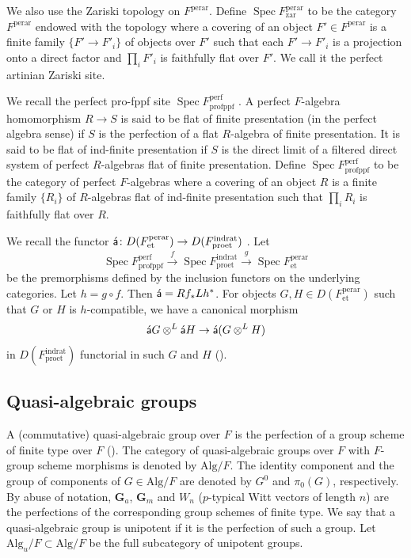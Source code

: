 \documentclass{amsart}
\theoremstyle{remark}
\numberwithin{equation}{subsection}
\newcommand{\compose}{\mathbin{\circ}}
\newcommand{\tensor}{\mathbin{\otimes}}
\newcommand{\et}{\mathrm{et}}
\newcommand{\fppf}{\mathrm{fppf}}
\newcommand{\zar}{\mathrm{zar}}
\newcommand{\Gm}{\mathbf{G}_{m}}
\newcommand{\Ga}{\mathbf{G}_{a}}
\newcommand{\rat}{\mathrm{rat}}
\newcommand{\ind}{\mathrm{ind}}
\newcommand{\pro}{\mathrm{pro}}
\newcommand{\perf}{\mathrm{perf}}
\newcommand{\perar}{\mathrm{perar}}
\newcommand{\Alg}{\mathrm{Alg}}
\newcommand{\algebrize}{\Acute{\mathsf{a}}}
\DeclareMathOperator{\Spec}{Spec}
\begin{document}
We also use the Zariski topology on $F^{\perar}$.
Define $\Spec F^{\perar}_{\zar}$ to be the category $F^{\perar}$
endowed with the topology
where a covering of an object $F' \in F^{\perar}$
is a finite family $\{F' \to F'_{i}\}$ of objects over $F'$
such that each $F' \to F'_{i}$ is a projection onto a direct factor
and $\prod_{i} F'_{i}$ is faithfully flat over $F'$.
We call it the perfect artinian Zariski site.

We recall the perfect pro-fppf site $\Spec F^{\perf}_{\pro\fppf}$ \cite{Suz22Duality}.
A perfect $F$-algebra homomorphism $R \to S$ is said to be
flat of finite presentation (in the perfect algebra sense)
if $S$ is the perfection of a flat $R$-algebra of finite presentation.
It is said to be flat of ind-finite presentation
if $S$ is the direct limit of a filtered direct system of perfect $R$-algebras
flat of finite presentation.
Define $\Spec F^{\perf}_{\pro\fppf}$ to be the category of perfect $F$-algebras
where a covering of an object $R$ is a finite family $\{R_{i}\}$ of $R$-algebras
flat of ind-finite presentation such that $\prod_{i} R_{i}$ is faithfully flat over $R$.

We recall the functor
$\algebrize \colon D(F^{\perar}_{\et}) \to D(F^{\ind\rat}_{\pro\et})$
\cite{Suz21}.
Let
	\begin{equation} \label{0460}
			\Spec F^{\perf}_{\pro\fppf}
		\stackrel{f}{\to}
			\Spec F^{\ind\rat}_{\pro\et}
		\stackrel{g}{\to}
			\Spec F^{\perar}_{\et}
	\end{equation}
be the premorphisms defined by the inclusion functors on the underlying categories.
Let $h = g \compose f$.
Then $\algebrize = R f_{\ast} L h^{\ast}$.
For objects $G, H \in D(F^{\perar}_{\et})$ such that $G$ or $H$ is $h$-compatible,
we have a canonical morphism
	\begin{equation} \label{0453}
			\algebrize G \tensor^{L} \algebrize H
		\to
			\algebrize(G \tensor^{L} H)
	\end{equation}
in $D(F^{\ind\rat}_{\pro\et})$ functorial in such $G$ and $H$
(\cite[Proposition 7.8]{Suz21}).


\subsection{Quasi-algebraic groups}

A (commutative) quasi-algebraic group over $F$ is
the perfection of a group scheme of finite type over $F$
(\cite{Ser60}).
The category of quasi-algebraic groups over $F$ with $F$-group scheme morphisms
is denoted by $\Alg / F$.
The identity component and the group of components of $G \in \Alg / F$ are denoted
by $G^{0}$ and $\pi_{0}(G)$, respectively.
By abuse of notation, $\Ga$, $\Gm$ and $W_{n}$ ($p$-typical Witt vectors of length $n$)
are the perfections of the corresponding group schemes of finite type.
We say that a quasi-algebraic group is unipotent if it is the perfection of such a group.
Let $\Alg_{u} / F \subset \Alg / F$ be the full subcategory of unipotent groups.
\end{document}
